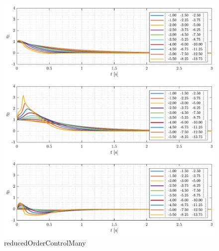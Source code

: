 \begin{adjustwidth}{-1.2cm}{-1.2cm}
\begin{minipage}{\textwidth}
  \begin{minipage}{0.58\textwidth}
    \begin{figure}[H]
      \includegraphics[width=\textwidth]{figures/reducedOrderControlMany}
      \caption{reducedOrderControlMany}
      \label{fig:reducedOrderControlMany}
    \end{figure}
  \end{minipage}
  \begin{minipage}{0.58\textwidth}
    \begin{figure}[H]

\end{figure}
\end{minipage}
\end{minipage}
\end{adjustwidth}
